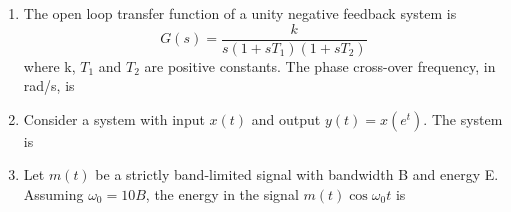 \documentclass[a4paper, 11pt]{article}
\begin{document}
\begin{enumerate}
    \hfill{}
    
    \item The open loop transfer function of a unity negative feedback system is
    \[G(s) = \frac{k}{s(1+sT_1)(1+sT_2)}\]
    where k, $T_1$ and $T_2$ are positive constants. The phase cross-over frequency, in rad/s, is
    \begin{enumerate}
    \end{enumerate}

    \hfill{}
    
    \item Consider a system with input $x(t)$ and output $y(t) = x(e^t)$. The system is
    \begin{enumerate}
    \end{enumerate}

    \hfill{}
    
    \item Let $m(t)$ be a strictly band-limited signal with bandwidth B and energy E. Assuming $\omega_0 = 10B$, the energy in the signal $m(t) \cos \omega_0 t$ is
    \begin{enumerate}
    \end{enumerate}
    

\end{enumerate}
\end{document}
